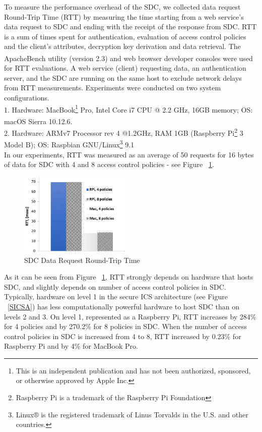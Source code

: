 \documentclass[conference]{IEEEtran}
\begin{document}
To measure the performance overhead of the SDC, we collected data request Round-Trip Time (RTT) by measuring the time starting from a web service's data request to SDC and ending with the receipt of the response from SDC. RTT is a sum of times spent for authentication, evaluation of access control policies and the client’s attributes, decryption key derivation and data retrieval. The ApacheBench\textsuperscript{\textregistered} utility (version 2.3) and web browser developer consoles were used for RTT evaluations. A web service (client) requesting data, an authentication server, and the SDC are running on the same host to exclude network delays from RTT measurements. Experiments were conducted on two system configurations. \\ 
1. Hardware: MacBook\textsuperscript{\textregistered}\footnote{This is an independent publication and has not been authorized, sponsored, or otherwise approved by Apple Inc.} Pro, Intel\textsuperscript{\textregistered} Core i7 CPU @ 2.2 GHz, 16GB memory; OS: macOS\textsuperscript{\textregistered} Sierra 10.12.6. \\
2. Hardware: ARMv7\textsuperscript{\textregistered} Processor rev 4 @1.2GHz, RAM 1GB (Raspberry Pi\textsuperscript{\textregistered}\footnote{Raspberry Pi is a trademark of the Raspberry Pi Foundation} 3 Model B); OS: Raspbian GNU/Linux\textsuperscript{\textregistered}\footnote{Linux® is the registered trademark of Linus Torvalds in the U.S. and other countries.} 9.1 \\
In our experiments, RTT was measured as an average of 50 requests for 16 bytes of data for SDC with 4 and 8 access control policies - see Figure ~\ref{eval-sdc}.

\begin{figure}[htbp]
\centering
\centerline{\includegraphics [width=.35\textwidth, height=4cm]{SDC-Eval-Plat-OK.png}}
\caption{SDC Data Request Round-Trip Time}
\label{eval-sdc}
\end{figure}

As it can be seen from Figure ~\ref{eval-sdc}, RTT strongly depends on hardware that hosts SDC, and slightly depends on number of access control policies in SDC. Typically, hardware on level 1 in the secure ICS architecture (see Figure ~\ref{SICSA}) has less computationally powerful hardware to host SDC than on levels 2 and 3. On level 1, represented as a Raspberry Pi, RTT increases by 284\% for 4 policies and by 270.2\% for 8 policies in SDC. When the number of access control policies in SDC is increased from 4 to 8, RTT increased by 0.23\% for Raspberry Pi and by 4\% for MacBook Pro.     
\end{document}
